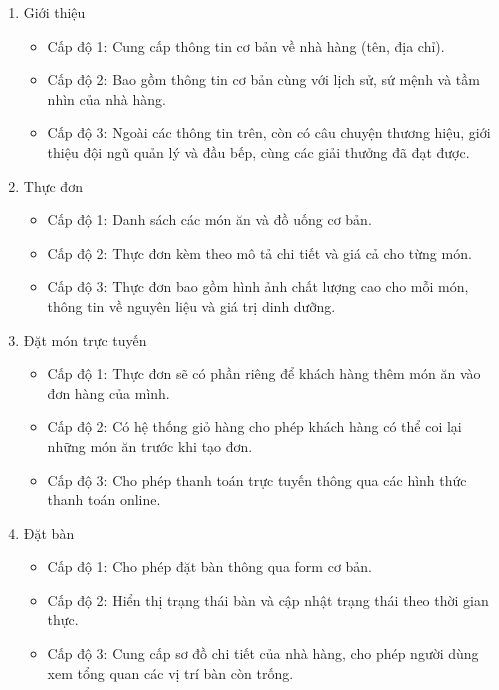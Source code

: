         \begin{enumerate}
            \item Giới thiệu
                \begin{itemize}
                    \item Cấp độ 1: Cung cấp thông tin cơ bản về nhà hàng (tên, địa chỉ).
                    \item Cấp độ 2: Bao gồm thông tin cơ bản cùng với lịch sử, sứ mệnh và tầm nhìn của nhà hàng.
                    \item Cấp độ 3: Ngoài các thông tin trên, còn có câu chuyện thương hiệu, giới thiệu đội ngũ quản lý và đầu bếp, cùng các giải thưởng đã đạt được.
                \end{itemize}
            \item Thực đơn
                \begin{itemize}
                    \item Cấp độ 1: Danh sách các món ăn và đồ uống cơ bản.
                    \item Cấp độ 2: Thực đơn kèm theo mô tả chi tiết và giá cả cho từng món.
                    \item Cấp độ 3: Thực đơn bao gồm hình ảnh chất lượng cao cho mỗi món, thông tin về nguyên liệu và giá trị dinh dưỡng.
                \end{itemize}
            \item Đặt món trực tuyến
                \begin{itemize}
                    \item Cấp độ 1: Thực đơn sẽ có phần riêng để khách hàng thêm món ăn vào đơn hàng của mình.
                    \item Cấp độ 2: Có hệ thống giỏ hàng cho phép khách hàng có thể coi lại những món ăn trước khi tạo đơn.
                    \item Cấp độ 3: Cho phép thanh toán trực tuyến thông qua các hình thức thanh toán online.
                \end{itemize}
            \item Đặt bàn
                \begin{itemize}
                    \item Cấp độ 1: Cho phép đặt bàn thông qua form cơ bản.
                    \item Cấp độ 2: Hiển thị trạng thái bàn và cập nhật trạng thái theo thời gian thực.
                    \item Cấp độ 3: Cung cấp sơ đồ chi tiết của nhà hàng, cho phép người dùng xem tổng quan các vị trí bàn còn trống.

\end{itemize}
\end{enumerate}
